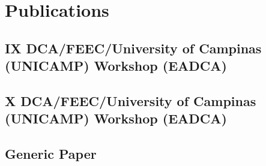 \chapter{Publications}


\section{IX DCA/FEEC/University of Campinas (UNICAMP) Workshop (EADCA)}



\section{X DCA/FEEC/University of Campinas (UNICAMP) Workshop (EADCA)}



\section{Generic Paper}



